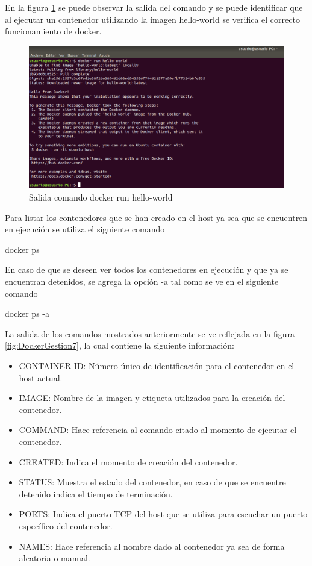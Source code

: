 En la figura \ref{fig:DockerGestion6} se puede observar la salida del comando y se puede identificar que al ejecutar un contenedor utilizando la imagen hello-world se verifica el correcto funcionamiento de docker.

\begin{figure}[!hbtp]
	\centering
	\includegraphics[width=\linewidth]{Trabajo/RecursosEducativos/RE05_Docker/Gestion_basica/REDocker_Gestion6.png}
	\vspace{-0.2cm}
	\caption{Salida comando docker run hello-world}
	\label{fig:DockerGestion6}
\end{figure}

Para listar los contenedores que se han creado en el host ya sea que se encuentren en ejecución se utiliza el siguiente comando
\begin{commandshell} docker ps \end{commandshell}

En caso de que se deseen ver todos los contenedores en ejecución y que ya se encuentran detenidos, se agrega la opción -a tal como se ve en el siguiente comando
\begin{commandshell} docker ps -a \end{commandshell}

La salida de los comandos mostrados anteriormente se ve reflejada en la figura \ref{fig:DockerGestion7}, la cual contiene la siguiente información: 
\begin{itemize}
    \item CONTAINER ID: Número único de identificación para el contenedor en el host actual.
    \item IMAGE: Nombre de la imagen y etiqueta utilizados para la creación del contenedor.
    \item COMMAND: Hace referencia al comando citado al momento de ejecutar el contenedor.
    \item CREATED: Indica el momento de creación del contenedor.
    \item STATUS: Muestra el estado del contenedor, en caso de que se encuentre detenido indica el tiempo de terminación.
    \item PORTS: Indica el puerto TCP del host que se utiliza para escuchar un puerto específico del contenedor.
    \item NAMES: Hace referencia al nombre dado al contenedor ya sea de forma aleatoria o manual. 
\end{itemize}

